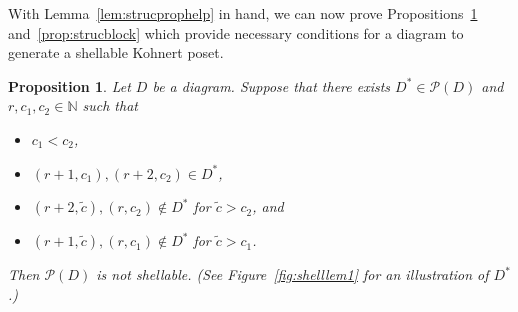 \documentclass[letterpaper,10pt]{article}
\newtheorem{corollary}[theorem]{Corollary}
\newtheorem{prop}[theorem]{Proposition}
\newcommand{\ldownarrow}{\Big\downarrow}
\newcommand{\precdot}{\prec\mathrel{\mkern-5mu}\mathrel{\cdot}}
\begin{document}

With Lemma~\ref{lem:strucprophelp} in hand, we can now prove Propositions~\ref{prop:strucasc} and~\ref{prop:strucblock} which provide necessary conditions for a diagram to generate a shellable Kohnert poset.

\begin{prop}\label{prop:strucasc}
    Let $D$ be a diagram. Suppose that there exists $D^*\in \mathcal{P}(D)$ and $r,c_1,c_2\in\mathbb{N}$ such that 
    \begin{itemize}
        \item[\textup{(i)}] $c_1<c_2$,
        \item[\textup{(ii)}] $(r+1,c_1),(r+2,c_2)\in D^*$,
        \item[\textup{(iii)}] $(r+2,\tilde{c}),(r,c_2)\notin D^*$ for $\tilde{c}>c_2$, and
        \item[\textup{(iv)}] $(r+1,\tilde{c}),(r,c_1)\notin D^*$ for $\tilde{c}>c_1$.
    \end{itemize}
    Then $\mathcal{P}(D)$ is not shellable. \textup(See Figure~\ref{fig:shelllem1} for an illustration of $D^*$.\textup)
\end{prop}
\end{document}
